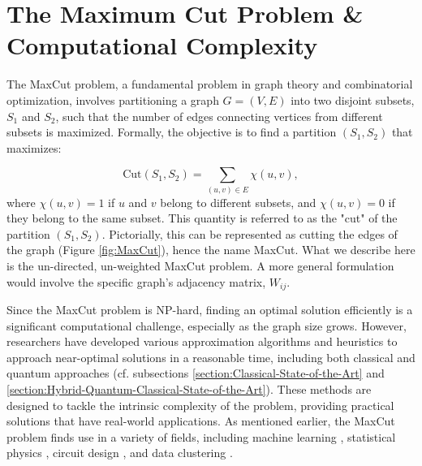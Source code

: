 \section{The Maximum Cut Problem \& Computational Complexity}
\label{section:MaxCut_Comp._Complexity}

The MaxCut problem, a fundamental problem in graph theory and combinatorial optimization, involves partitioning a graph \( G = (V, E) \) into two disjoint subsets, \( S_1 \) and \( S_2 \), such that the number of edges connecting vertices from different subsets is maximized. Formally, the objective is to find a partition \( (S_1, S_2) \) that maximizes:

\begin{equation}\label{eq:Cut}
\text{Cut}(S_1, S_2) = \sum_{(u, v) \in E} \chi(u, v),
\end{equation}
where \( \chi(u, v) = 1 \) if \( u \) and \( v \) belong to different subsets, and \( \chi(u, v) = 0 \) if they belong to the same subset. This quantity is referred to as the "cut" of the partition $(S_1, S_2)$. Pictorially, this can be represented as cutting the edges of the graph (Figure \ref{fig:MaxCut}), hence the name MaxCut. What we describe here is the un-directed, un-weighted MaxCut problem. A more general formulation would involve the specific graph's adjacency matrix, $W_{ij}$.

Since the MaxCut problem is NP-hard, finding an optimal solution efficiently is a significant computational challenge, especially as the graph size grows. However, researchers have developed various approximation algorithms and heuristics to approach near-optimal solutions in a reasonable time, including both classical and quantum approaches (cf. subsections \ref{section:Classical-State-of-the-Art} and \ref{section:Hybrid-Quantum-Classical-State-of-the-Art}). These methods are designed to tackle the intrinsic complexity of the problem, providing practical solutions that have real-world applications. As mentioned earlier, the MaxCut problem finds use in a variety of fields, including machine learning \cite{937505}, statistical physics \cite{Barahona_Grötschel_Jünger_Reinelt_1988}, circuit design \cite{Barahona_Grötschel_Jünger_Reinelt_1988}, and data clustering \cite{10.1007/11893318_21}.

